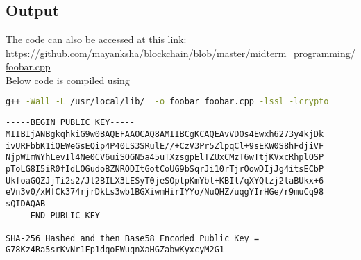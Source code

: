 \section{}

\subsection{Output}
The code can also be accessed at this link:  \\
\url{https://github.com/mayanksha/blockchain/blob/master/midterm\_programming/foobar.cpp}\\
Below code is compiled using 

\begin{lstlisting}[language=bash]
g++ -Wall -L /usr/local/lib/  -o foobar foobar.cpp -lssl -lcrypto
\end{lstlisting}
\begin{lstlisting}
-----BEGIN PUBLIC KEY-----
MIIBIjANBgkqhkiG9w0BAQEFAAOCAQ8AMIIBCgKCAQEAvVDOs4Ewxh6273y4kjDk
ivURFbbK1iQEWeGsEQip4P40LS3SRulE//+CzV3Pr5ZlpqCl+9sEKW0S8hFdjiVF
NjpWImWYhLevIl4Ne0CV6uiSOGN5a45uTXzsgpElTZUxCMzT6wTtjKVxcRhplOSP
pToLG8I5iR0fIdLOGudoBZNRODItGotCoUG9bSqrJi10rTjrOowDIjJg4itsECbP
UkfoaGQZJjTi2s2/Jl2BILX3LESyT0jeSOptpKmYbl+KBIl/qXYQtzj2laBUkx+6
eVn3v0/xMfCk374rjrDkLs3wb1BGXiwmHirIYYo/NuQHZ/uqgYIrHGe/r9muCq98
sQIDAQAB
-----END PUBLIC KEY-----

SHA-256 Hashed and then Base58 Encoded Public Key = 
G78Kz4Ra5srKvNr1Fp1dqoEWuqnXaHGZabwKyxcyM2G1
\end{lstlisting}

